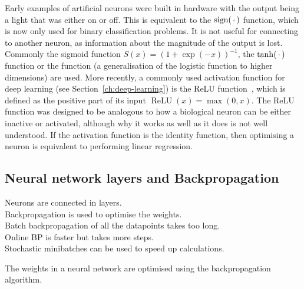 Early examples of artificial neurons were built in hardware with the output being a light that was either on or off.
This is equivalent to the \(\operatorname{sign}(\,\cdot\,)\) function, which is now only used for binary classification problems.
It is not useful for connecting to another neuron, as information about the magnitude of the output is lost.
Commonly the sigmoid function \(S(x) = (1 + \exp(-x))^{-1}\), the \(\tanh(\,\cdot\,)\) function or the  function (a generalisation of the logistic function to higher dimensions) are used.
More recently, a commonly used activation function for deep learning (see Section~\ref{ch:deep-learning}) is the \ac{ReLU} function~\autocite{ramachandran2017}, which is defined as the positive part of its input \(\operatorname{ReLU}(x) = \max(0, x)\).
The \ac{ReLU} function was designed to be analogous to how a biological neuron can be either inactive or activated, although why it works as well as it does is not well understood.
If the activation function is the identity function, then optimising a neuron is equivalent to performing linear regression.

\subsection{Neural network layers and Backpropagation} \label{ch:backpropagation}

\begin{todo}
	Neurons are connected in layers. \\
	Backpropagation is used to optimise the weights. \\
	Batch backpropagation of all the datapoints takes too long. \\
	Online BP is faster but takes more steps. \\
	Stochastic minibatches can be used to speed up calculations. 
\end{todo}

The weights in a neural network are optimised using the backpropagation algorithm.

